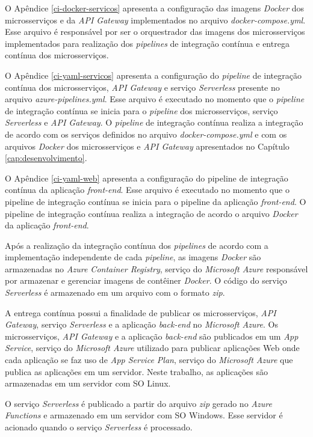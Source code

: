 O Apêndice \ref{ci-docker-servicos} apresenta a configuração das imagens \textit{Docker} dos microsserviços e da \textit{API Gateway} implementados no arquivo \textit{docker-compose.yml}. Esse arquivo é responsável por ser o orquestrador das imagens dos microsserviços implementados para realização dos \textit{pipelines} de integração contínua e entrega contínua dos microsserviços.

O Apêndice \ref{ci-yaml-servicos} apresenta a configuração do \textit{pipeline} de integração contínua dos microsserviços, \textit{API Gateway} e serviço \textit{Serverless} presente no arquivo \textit{azure-pipelines.yml}. Esse arquivo é executado no momento que o \textit{pipeline} de integração contínua se inicia para o \textit{pipeline} dos microsserviços, serviço \textit{Serverless} e \textit{API Gateway}. O \textit{pipeline} de integração contínua realiza a integração de acordo com os serviços definidos no arquivo \textit{docker-compose.yml} e com os arquivos \textit{Docker} dos microsserviços e \textit{API Gateway} apresentados no Capítulo \ref{cap:desenvolvimento}.

O Apêndice \ref{ci-yaml-web} apresenta a configuração do pipeline de integração contínua da aplicação \textit{front-end}. Esse arquivo é executado no momento que o pipeline de integração contínua se inicia para o pipeline da aplicação \textit{front-end}. O pipeline de integração contínua realiza a integração de acordo o arquivo \textit{Docker} da aplicação \textit{front-end}.

Após a realização da integração contínua dos \textit{pipelines} de acordo com a implementação independente de cada \textit{pipeline}, as imagens \textit{Docker} são armazenadas no \textit{Azure Container Registry}, serviço do \textit{Microsoft Azure} responsável por armazenar e gerenciar imagens de contêiner \textit{Docker}. O código do serviço \textit{Serverless} é armazenado em um arquivo com o formato \textit{zip}.

A entrega contínua possui a finalidade de publicar os microsserviços, \textit{API Gateway}, serviço \textit{Serverless} e a aplicação \textit{back-end} no \textit{Microsoft Azure}. Os microsserviços, \textit{API Gateway} e a aplicação \textit{back-end} são publicados em um \textit{App Service}, serviço do \textit{Microsoft Azure} utilizado para publicar aplicações Web onde cada aplicação se faz uso de \textit{App Service Plan}, serviço do \textit{Microsoft Azure} que publica as aplicações em um servidor. Neste trabalho, as aplicações são armazenadas em um servidor com \acrshort{SO} Linux.

O serviço \textit{Serverless} é publicado a partir do arquivo \textit{zip} gerado no \textit{Azure Functions} e armazenado em um servidor com \acrshort{SO} Windows. Esse servidor é acionado quando o serviço \textit{Serverless} é processado.